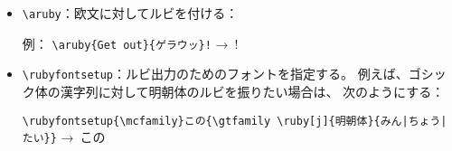 \documentclass[autodetect-engine,dvi=dvipdfmx,ja=standard,
  a4paper]{bxjsarticle}
\begin{document}
\begin{itemize}
\item \verb+\aruby+：欧文に対してルビを付ける：
\par\noindent 例：\quad
\verb+!+ →\
  \aruby{Get out}{ゲラウッ}!
\item \verb+\rubyfontsetup+：ルビ出力のためのフォントを指定する。
例えば、ゴシック体の漢字列に対して明朝体のルビを振りたい場合は、
次のようにする：
\par\noindent
{\small
\verb+\rubyfontsetup{\mcfamily}この{\gtfamily {}}+}
→\
{\rubyfontsetup{\mcfamily}この{\gtfamily \ruby[j]{明朝体}{みん|ちょう|たい}}}
\end{itemize}
\end{document}

